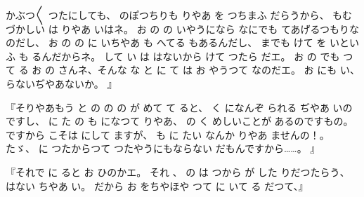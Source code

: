 かぶつ〳〵
つたにしても、
のぽつちりも
りやあ
を
つちまふ
だらうから、
もむづかしい
は
りやあ
いはネ。
お
の
の
いやうになら
なにでも
てあげるつもりなのだし、
お
の
の
に
いちやあ
も
へてる
もあるんだし、
までも
けて
を
いといふ
も
るんだからネ。
して
い
は
はないから
けて
つたら
だエ。
お
の
でも
つて
る
お
の
さんネ、そんな
な
と
に
て
は
お
やうつて
なのだエ。
お
にも
い、
らないぢやあないか。
』

『そりやあもう
と
の
の
の
が
めて
て
ると、
く
になんぞ
られる
ぢやあ
いのですし、
に
た
の
も
になつて
りやあ、
の
く
めしいことが
あるのですもの。
ですから
こそは
にして
ますが、
も
に
たい
なんか
りやあ
ませんの！。
たゞ、
に
つたからつて
つたやうにもならない
だもんですから……。
』

『それで
に
ると
お
ひのかエ。
それ
、
の
は
つから
が
した
りだつたらう、
はない
ちやあ
い。
だから
お
をちやほや
つて
に
いて
る
だつて、』

